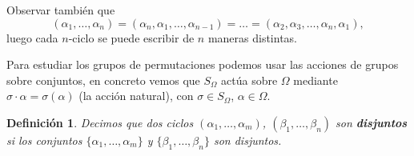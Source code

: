 \documentclass[12pt]{article}
\newtheorem{definition}[theorem]{Definición}
\begin{document}
Observar también que $$(\alpha_1, \ldots, \alpha_n) = (\alpha_n, \alpha_1, \ldots, \alpha_{n-1}) = \ldots = (\alpha_2, \alpha_3, \ldots, \alpha_n, \alpha_1),$$ luego cada $n$-ciclo se puede escribir de $n$ maneras distintas.

Para estudiar los grupos de permutaciones podemos usar las acciones de grupos sobre conjuntos, en concreto vemos que $S_\Omega$ actúa sobre $\Omega$ mediante $\sigma \cdot \alpha = \sigma(\alpha)$ (la acción natural), con $\sigma \in S_\Omega$, $\alpha \in \Omega$.

\begin{definition}Decimos que dos ciclos $(\alpha_1, \ldots, \alpha_m)$, $(\beta_1, \ldots, \beta_n)$ son \textbf{disjuntos} si los conjuntos $\lbrace \alpha_1, \ldots, \alpha_m \rbrace$ y $\lbrace \beta_1, \ldots, \beta_n \rbrace$ son disjuntos.
\end{definition}
\end{document}
